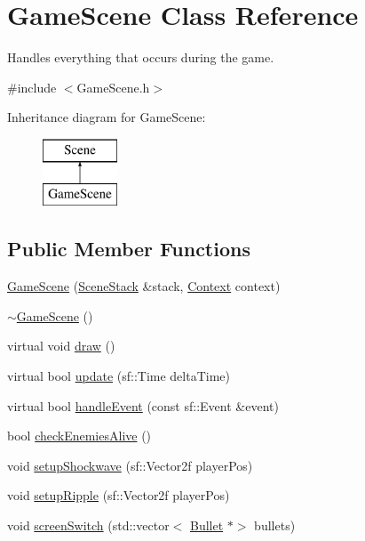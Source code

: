 \hypertarget{class_game_scene}{}\section{Game\+Scene Class Reference}
\label{class_game_scene}


Handles everything that occurs during the game.  




{\ttfamily \#include $<$Game\+Scene.\+h$>$}

Inheritance diagram for Game\+Scene\+:\begin{figure}[H]
\begin{center}
\leavevmode
\includegraphics[height=2.000000cm]{class_game_scene}
\end{center}
\end{figure}
\subsection*{Public Member Functions}
\begin{DoxyCompactItemize}
\item 
\hyperlink{class_game_scene_a09ae1eacea6ea92074d008c016e0ed1f}{Game\+Scene} (\hyperlink{class_scene_stack}{Scene\+Stack} \&stack, \hyperlink{struct_scene_1_1_context}{Context} context)
\item 
\hyperlink{class_game_scene_add5bc48c372aaa7f526c02558a8adf00}{$\sim$\+Game\+Scene} ()
\item 
virtual void \hyperlink{class_game_scene_ae9eb60cbb8fa55eeb07b951e3d83f426}{draw} ()
\item 
virtual bool \hyperlink{class_game_scene_ae54628d2f041bcad66242584b2db10d6}{update} (sf\+::\+Time delta\+Time)
\item 
virtual bool \hyperlink{class_game_scene_aa494372b1f451f3c3a268558fddb30f2}{handle\+Event} (const sf\+::\+Event \&event)
\item 
bool \hyperlink{class_game_scene_a6cef526c611ff96b8771e60eea8ccebe}{check\+Enemies\+Alive} ()
\item 
void \hyperlink{class_game_scene_a67664e1bbce6bec9eda855a9b109d9ec}{setup\+Shockwave} (sf\+::\+Vector2f player\+Pos)
\item 
void \hyperlink{class_game_scene_aca0b30f731595929fb7182e2f65941b1}{setup\+Ripple} (sf\+::\+Vector2f player\+Pos)
\item 
void \hyperlink{class_game_scene_a030583d6469d9f44fda3fc5777c46a08}{screen\+Switch} (std\+::vector$<$ \hyperlink{class_bullet}{Bullet} $\ast$$>$ bullets)
\end{DoxyCompactItemize}
